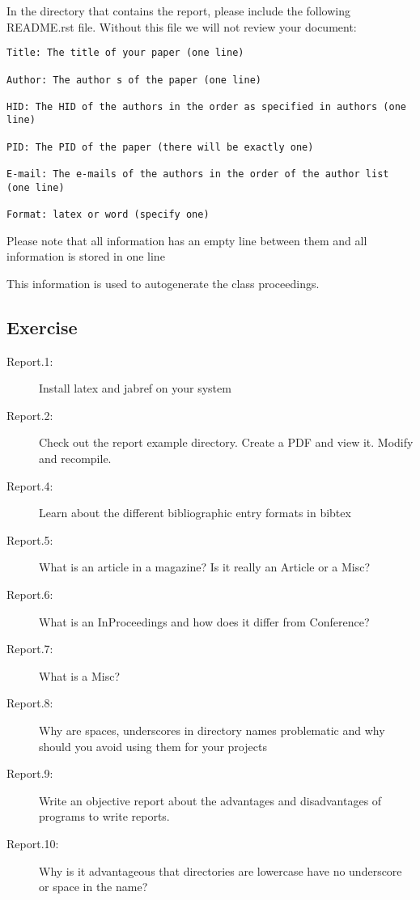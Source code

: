 In the directory that contains the report, please include the following
README.rst file. Without this file we will not review your document:

\begin{verbatim}
Title: The title of your paper (one line)

Author: The author s of the paper (one line)

HID: The HID of the authors in the order as specified in authors (one line)

PID: The PID of the paper (there will be exactly one)

E-mail: The e-mails of the authors in the order of the author list (one line)

Format: latex or word (specify one)
\end{verbatim}

Please note that all information has an empty line between them and all
information is stored in one line

This information is used to autogenerate the class proceedings.

\subsection{Exercise}\label{exercise}

\begin{description}
\item[Report.1:]
Install latex and jabref on your system
\item[Report.2:]
Check out the report example directory. Create a PDF and view it. Modify
and recompile.
\item[Report.4:]
Learn about the different bibliographic entry formats in bibtex
\item[Report.5:]
What is an article in a magazine? Is it really an Article or a Misc?
\item[Report.6:]
What is an InProceedings and how does it differ from Conference?
\item[Report.7:]
What is a Misc?
\item[Report.8:]
Why are spaces, underscores in directory names problematic and why
should you avoid using them for your projects
\item[Report.9:]
Write an objective report about the advantages and disadvantages of
programs to write reports.
\item[Report.10:]
Why is it advantageous that directories are lowercase have no underscore
or space in the name?
\end{description}
